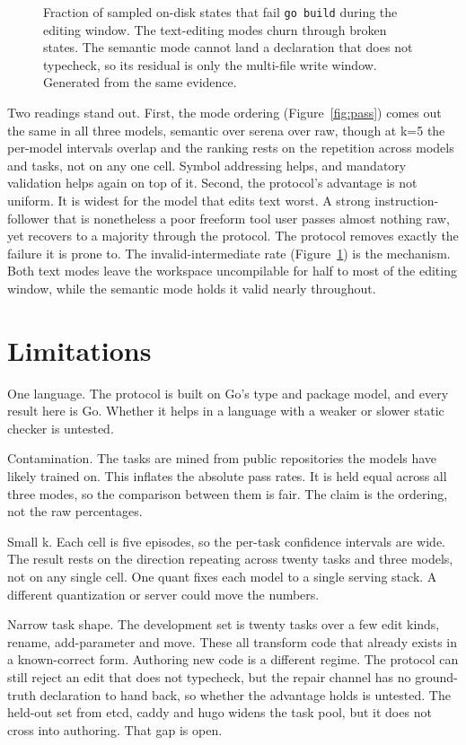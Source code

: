 \documentclass[11pt]{article}
\begin{document}
\begin{figure}[tbp]
\centering

\caption{Fraction of sampled on-disk states that fail \texttt{go build}
during the editing window. The text-editing modes churn through broken
states. The semantic mode cannot land a declaration that does not
typecheck, so its residual is only the multi-file write window.
Generated from the same evidence.}
\label{fig:invalid}
\end{figure}

Two readings stand out. First, the mode ordering
(Figure~\ref{fig:pass}) comes out the same in all three models, semantic
over serena over raw, though at k=5 the per-model intervals overlap and
the ranking rests on the repetition across models and tasks, not on any
one cell. Symbol addressing helps, and mandatory validation helps again
on top of it. Second, the
protocol's advantage is not uniform. It is widest for the model that
edits text worst. A strong instruction-follower that is nonetheless a
poor freeform tool user passes almost nothing raw, yet recovers to a
majority through the protocol. The protocol removes exactly the failure
it is prone to. The invalid-intermediate rate (Figure~\ref{fig:invalid})
is the mechanism. Both text modes leave the workspace uncompilable for
half to most of the editing window, while the semantic mode holds it
valid nearly throughout.

\FloatBarrier

\section{Limitations}
One language. The protocol is built on Go's type and package model, and
every result here is Go. Whether it helps in a language with a weaker or
slower static checker is untested.

Contamination. The tasks are mined from public repositories the models
have likely trained on. This inflates the absolute pass rates. It is
held equal across all three modes, so the comparison between them is
fair. The claim is the ordering, not the raw percentages.

Small k. Each cell is five episodes, so the per-task confidence
intervals are wide. The result rests on the direction repeating across
twenty tasks and three models, not on any single cell. One quant fixes
each model to a single serving stack. A different quantization or server
could move the numbers.

Narrow task shape. The development set is twenty tasks over a few edit
kinds, rename, add-parameter and move. These all transform code that
already exists in a known-correct form. Authoring new code is a
different regime. The protocol can still reject an edit that does not
typecheck, but the repair channel has no ground-truth declaration to
hand back, so whether the advantage holds is untested. The held-out set
from etcd, caddy and hugo widens the task pool, but it does not cross
into authoring. That gap is open.
\end{document}
